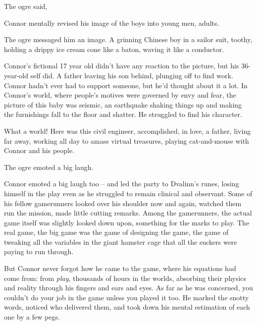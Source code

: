 The ogre said,


Connor mentally revised his image of the boys into young men,
adults.



The ogre messaged him an image. A grinning Chinese boy in a sailor
suit, toothy, holding a drippy ice cream cone like a baton, waving
it like a conductor.

Connor's fictional 17 year old didn't have any reaction to the
picture, but his 36-year-old self did. A father leaving his son
behind, plunging off to find work. Connor hadn't ever had to
support someone, but he'd thought about it a lot. In Connor's
world, where people's motives were governed by envy and fear, the
picture of this baby was seismic, an earthquake shaking things up
and making the furnishings fall to the floor and shatter. He
struggled to find his character.



What a world! Here was this civil engineer, accomplished, in love,
a father, living far away, working all day to amass virtual
treasures, playing cat-and-mouse with Connor and his people.


The ogre emoted a big laugh.


Connor emoted a big laugh too -- and led the party to Dvalinn's
runes, losing himself in the play even as he struggled to remain
clinical and observant. Some of his fellow gamerunners looked over
his shoulder now and again, watched them run the mission, made
little cutting remarks. Among the gamerunners, the actual game
itself was slightly looked down upon, something for the marks to
play. The real game, the big game was the game of designing the
game, the game of tweaking all the variables in the giant hamster
cage that all the suckers were paying to run through.

But Connor never forgot how he came to the game, where his
equations had come from: from \emph{play}, thousands of hours in
the worlds, absorbing their physics and reality through his fingers
and ears and eyes. As far as he was concerned, you couldn't do your
job in the game unless you played it too. He marked the snotty
words, noticed who delivered them, and took down his mental
estimation of each one by a few pegs.

